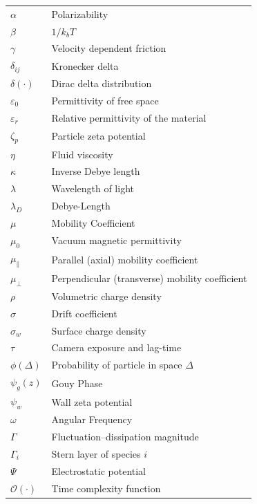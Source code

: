 \documentclass[12pt, oneside]{book}
\begin{document}
\begin{longtable}{@{} p{} @{\hspace{1em}} p{} @{}}
    $\alpha$             & Polarizability \\
    $\beta$              & $1/k_b T$ \\
    $\gamma$             & Velocity dependent friction\\
    $\delta_{ij}$        & Kronecker delta \\
    $\delta(\cdot)$      & Dirac delta distribution \\
    $\varepsilon_0$      & Permittivity of free space \\
    $\varepsilon_r$      & Relative permittivity of the material \\
    $\zeta_p$            & Particle zeta potential \\
    $\eta$               & Fluid viscosity \\
    $\kappa$             & Inverse Debye length \\
    $\lambda$            & Wavelength of light \\
    $\lambda_D$          & Debye-Length \\
    $\mu$                & Mobility Coefficient \\
    $\mu_0$              & Vacuum magnetic permittivity \\
    $\mu_\parallel$      & Parallel (axial) mobility coefficient \\
    $\mu_\perp$          & Perpendicular (transverse) mobility coefficient \\
    $\rho$               & Volumetric charge density \\
    $\sigma$             & Drift coefficient\\
    $\sigma_w$           & Surface charge density \\
    $\tau$               & Camera exposure and lag-time \\
    $\phi(\Delta)$        & Probability of particle in space $\Delta$ \\
    $\psi_g(z)$          & Gouy Phase \\
    $\psi_w$             & Wall zeta potential \\
    $\omega$             & Angular Frequency\\
    $\Gamma$             & Fluctuation--dissipation magnitude \\
    $\Gamma_i$           & Stern layer of species $i$ \\
    $\Psi$               & Electrostatic potential \\

    $\mathcal{O}(\cdot)$ & Time complexity function \\

    \end{longtable}
    \endgroup
    
\end{document}
